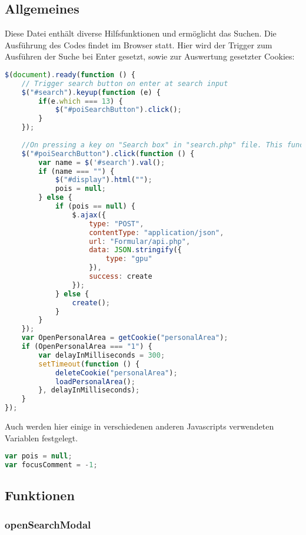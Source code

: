 \subsection{Allgemeines} Diese Datei enthält diverse Hilfsfunktionen und ermöglicht das Suchen.
Die Ausführung des Codes findet im Browser statt. Hier wird der Trigger zum Ausführen der Suche bei Enter gesetzt, sowie zur Auswertung gesetzter Cookies:
\begin{lstlisting}[language=JavaScript]
$(document).ready(function () {
	// Trigger search button on enter at search input
	$("#search").keyup(function (e) {
		if(e.which === 13) {
			$("#poiSearchButton").click();
		}
	});
	
	//On pressing a key on "Search box" in "search.php" file. This function will be called.
	$("#poiSearchButton").click(function () {
		var name = $('#search').val();
		if (name === "") {
			$("#display").html("");
			pois = null;
		} else {
			if (pois == null) {
				$.ajax({
					type: "POST",
					contentType: "application/json",
					url: "Formular/api.php",
					data: JSON.stringify({
						type: "gpu"
					}),
					success: create
				});
			} else {
				create();
			}
		}
	});
	var OpenPersonalArea = getCookie("personalArea");
	if (OpenPersonalArea === "1") {
		var delayInMilliseconds = 300;
		setTimeout(function () {
			deleteCookie("personalArea");
			loadPersonalArea();
		}, delayInMilliseconds);
	}
});
\end{lstlisting} 
Auch werden hier einige in verschiedenen anderen Javascripts verwendeten Variablen festgelegt.
\begin{lstlisting}[language=JavaScript]
var pois = null;
var focusComment = -1;
\end{lstlisting} 
\newpage
\subsection{Funktionen}
\subsubsection{openSearchModal}
